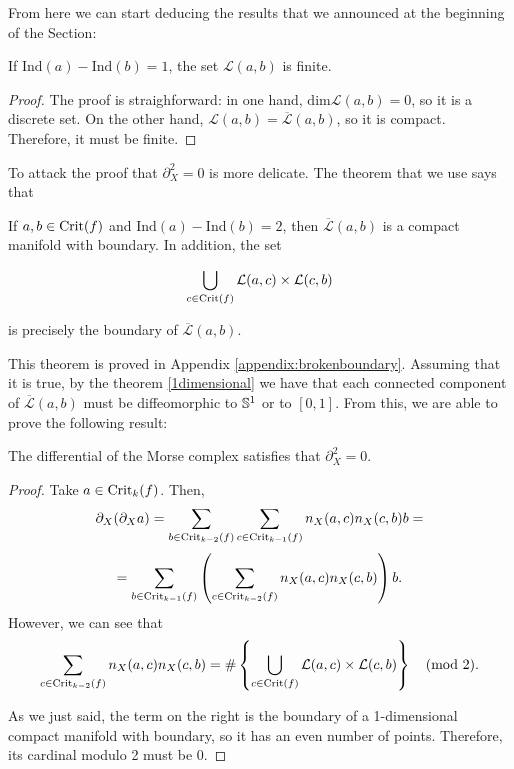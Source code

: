 From here we can start deducing the results that we announced at the beginning of the Section:

\begin{coro}
If $\text{Ind}(a)-\text{Ind}(b) = 1$, the set $\mathcal{L}(a,b)$ is finite.
\end{coro}

\begin{proof}
The proof is straighforward: in one hand, $\text{dim} \mathcal{L}(a,b) = 0$, so it is a discrete set. On the other hand, $\mathcal{L}(a,b) = \overline{\mathcal{L}}(a,b)$, so it is compact. Therefore, it must be finite.
\end{proof}

To attack the proof that $\partial_X^2 = 0$ is more delicate.
The theorem that we use says that

\begin{theo} \label{morse_brokenboundary}
If $a, b \in \mathrm{Crit}(f)$ and $\text{Ind}(a)-\text{Ind}(b) = 2$, then $\overline{\mathcal{L}}(a,b)$ is a compact manifold with boundary. In addition, the set

\[\bigcup_{c \in \mathrm{Crit}(f)} \mathcal{L}(a,c) \times \mathcal{L}(c,b)\]

is precisely the boundary of $\overline{\mathcal{L}}(a,b)$.
\end{theo}

This theorem is proved in Appendix \ref{appendix:brokenboundary}. Assuming that it is true, by the theorem \ref{1dimensional} we have that each connected component of $\overline{\mathcal{L}}(a,b)$ must be diffeomorphic to $\mathbb{S}^1$ or to $[0,1]$. From this, we are able to prove the following result:

\begin{coro} The differential of the Morse complex satisfies that $\partial_X^2 = 0$.
\end{coro}

\begin{proof}
Take $a \in \mathrm{Crit}_k(f)$. Then,
\[\partial_X (\partial_X a) = \sum_{b \in \mathrm{Crit}_{k-2}(f)} \sum_{c \in \mathrm{Crit}_{k-1}(f)} n_X(a,c) n_X(c,b) b =\]
\[= \sum_{b \in \mathrm{Crit}_{k-1}(f)} \left( \sum_{c \in \mathrm{Crit}_{k-2}(f)} n_X(a,c) n_X(c,b) \right) b .\]
However, we can see that
\[\sum_{c \in \mathrm{Crit}_{k-2}(f)} n_X(a,c) n_X(c,b) = \# \left\{ \bigcup_{c \in \mathrm{Crit}(f)} \mathcal{L}(a,c) \times \mathcal{L}(c,b) \right\} \quad (\text{mod } 2).\]

As we just said, the term on the right is the boundary of a 1-dimensional compact manifold with boundary, so it has an even number of points. Therefore, its cardinal modulo 2 must be 0.
\end{proof}
